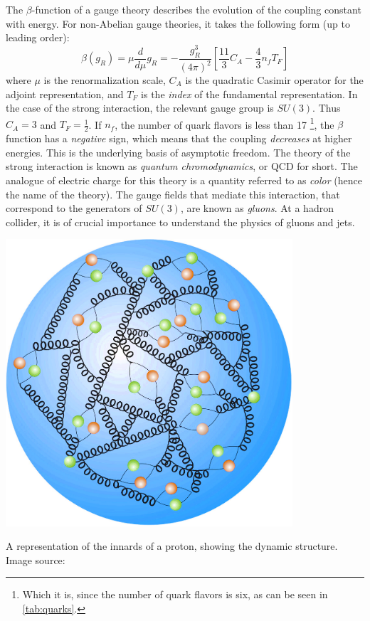 The $\beta$-function of a gauge theory describes the evolution of the coupling constant with energy. For non-Abelian gauge theories, it takes the following form (up to leading order):
\begin{equation}
  \beta(g_R) = \mu\frac{d}{d\mu}g_R = -\frac{g_R^3}{(4\pi)^2}\left[\frac{11}{3}C_A -\frac{4}{3}n_fT_F\right]
\end{equation}
where $\mu$ is the renormalization scale, $C_A$ is the quadratic Casimir operator for the adjoint representation, and $T_F$ is the \emph{index} of the fundamental representation.
In the case of the strong interaction, the relevant gauge group is $SU(3)$. Thus $C_A = 3$ and $T_F = \frac{1}{2}$. If $n_f$, the number of quark flavors is less than 17 \footnote{Which it is, since the number of quark flavors is six, as can be seen in \autoref{tab:quarks}.}, the $\beta$ function has a \emph{negative} sign, which means that the coupling \emph{decreases} at higher energies. This is the underlying basis of asymptotic freedom. The theory of the strong interaction is known as \emph{quantum chromodynamics}, or QCD for short. The analogue of electric charge for this theory is a quantity referred to as \emph{color} (hence the name of the theory). The gauge fields that mediate this interaction, that correspond to the generators of $SU(3)$, are known as \emph{gluons}. At a hadron collider, it is of crucial importance to understand the physics of gluons and jets.
\begin{marginfigure}[-15cm]
  \includegraphics[width=0.8\textwidth]{images/proton_innards}
\caption{A representation of the innards of a proton, showing the dynamic structure. Image source:\citep{proton_structure}}
\end{marginfigure}


